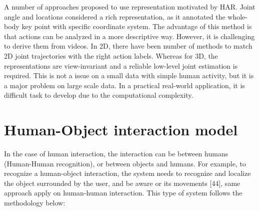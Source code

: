 A number of approaches proposed to use representation motivated by HAR. Joint angle and locations considered a rich representation, as it annotated the whole-body key point with specific coordinate system. The advantage of this method is that actions can be analyzed in a more descriptive way. However, it is challenging to derive them from videos. In 2D, there have been number of methods to match 2D joint trajectories with the right action labels. Whereas for 3D, the representations are view-invariant and a reliable low-level joint estimation is required. This is not a issue on a small data with simple human activity, but it is a major problem on large scale data. In a practical real-world application, it is difficult task to develop due to the computational complexity.


\section{Human-Object interaction model}
\hspace{5mm} In the case of human interaction, the interaction can be between humans (Human-Human recognition), or between objects and humans. For example, to recognize a human-object interaction, the system needs to recognize and localize the object surrounded by the user, and be aware or its movements [44], same approach apply on human-human interaction. This type of system follows the methodology below:\\

